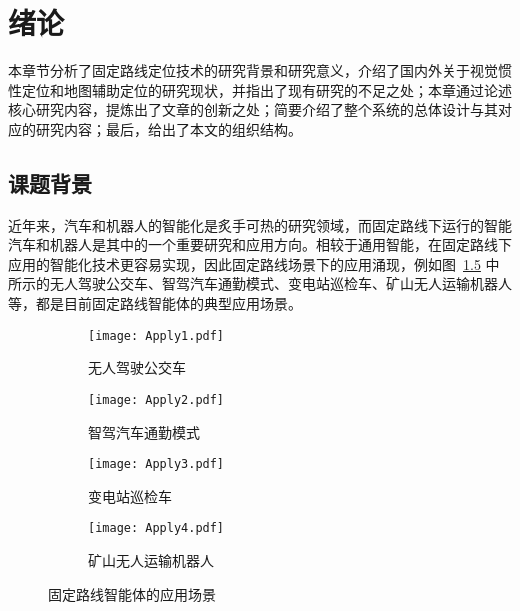 
\chapter{绪论}

本章节分析了固定路线定位技术的研究背景和研究意义，介绍了国内外关于视觉惯性定位和地图辅助定位的研究现状，并指出了现有研究的不足之处；本章通过论述核心研究内容，提炼出了文章的创新之处；简要介绍了整个系统的总体设计与其对应的研究内容；最后，给出了本文的组织结构。


\section{课题背景}

近年来，汽车和机器人的智能化是炙手可热的研究领域，而固定路线下运行的智能汽车和机器人是其中的一个重要研究和应用方向。相较于通用智能，在固定路线下应用的智能化技术更容易实现，因此固定路线场景下的应用涌现，例如图~\ref{fig:apply} 中所示的无人驾驶公交车\cite{stephen2023driverless}、智驾汽车通勤模式\cite{xin2023xinchuxing}、变电站巡检车\cite{song2020xinhuawang}、矿山无人运输机器人\cite{li2023keji}等，都是目前固定路线智能体的典型应用场景。

\begin{figure}[htbp]
  \centering
  \begin{subfigure}[b]{0.45\textwidth}
      \centering
      \texttt{[image: Apply1.pdf]}
      \caption{无人驾驶公交车\cite{stephen2023driverless}}
      \label{fig:apply_sub1}
  \end{subfigure}
  \begin{subfigure}[b]{0.45\textwidth}
      \centering
      \texttt{[image: Apply2.pdf]}
      \caption{智驾汽车通勤模式\cite{xin2023xinchuxing}}
      \label{fig:apply_sub2}
  \end{subfigure}
  \begin{subfigure}[b]{0.45\textwidth}
      \centering
      \texttt{[image: Apply3.pdf]}
      \caption{变电站巡检车\cite{song2020xinhuawang}}
      \label{fig:apply_sub3}
  \end{subfigure}
  \begin{subfigure}[b]{0.45\textwidth}
      \centering
      \texttt{[image: Apply4.pdf]}
      \caption{矿山无人运输机器人\cite{li2023keji}}
      \label{fig:apply_sub4}
  \end{subfigure}

  \caption{固定路线智能体的应用场景}
  \label{fig:apply}
\end{figure}


